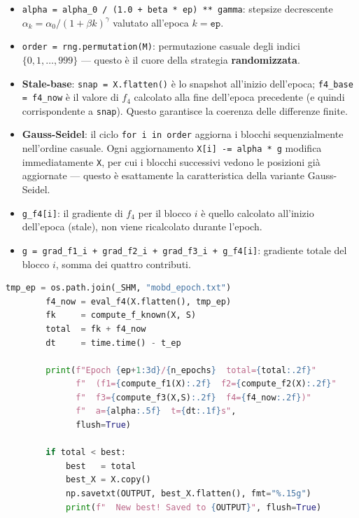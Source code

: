 \documentclass[12pt,a4paper]{article}
\theoremstyle{definition}
\begin{document}
\begin{itemize}[nosep]
  \item \texttt{alpha = alpha\_0 / (1.0 + beta * ep) ** gamma}: stepsize decrescente
        $\alpha_k = \alpha_0 / (1 + \beta k)^\gamma$ valutato all'epoca $k = \texttt{ep}$.
  \item \texttt{order = rng.permutation(M)}: permutazione casuale degli indici
        $\{0, 1, \ldots, 999\}$ — questo è il cuore della strategia \textbf{randomizzata}.
  \item \textbf{Stale-base}: \texttt{snap = X.flatten()} è lo snapshot all'inizio dell'epoca;
        \texttt{f4\_base = f4\_now} è il valore di $f_4$ calcolato alla fine dell'epoca precedente
        (e quindi corrispondente a \texttt{snap}). Questo garantisce la coerenza delle differenze
        finite.
  \item \textbf{Gauss-Seidel}: il ciclo \texttt{for i in order} aggiorna i blocchi
        sequenzialmente nell'ordine casuale. Ogni aggiornamento \texttt{X[i] -= alpha * g}
        modifica immediatamente \texttt{X}, per cui i blocchi successivi vedono le posizioni
        già aggiornate — questo è esattamente la caratteristica della variante Gauss-Seidel.
  \item \texttt{g\_f4[i]}: il gradiente di $f_4$ per il blocco $i$ è quello calcolato
        all'inizio dell'epoca (stale), non viene ricalcolato durante l'epoch.
  \item \texttt{g = grad\_f1\_i + grad\_f2\_i + grad\_f3\_i + g\_f4[i]}: gradiente totale
        del blocco $i$, somma dei quattro contributi.
\end{itemize}

\begin{lstlisting}[language=Python]
        tmp_ep = os.path.join(_SHM, "mobd_epoch.txt")
        f4_now = eval_f4(X.flatten(), tmp_ep)
        fk     = compute_f_known(X, S)
        total  = fk + f4_now
        dt     = time.time() - t_ep

        print(f"Epoch {ep+1:3d}/{n_epochs}  total={total:.2f}"
              f"  (f1={compute_f1(X):.2f}  f2={compute_f2(X):.2f}"
              f"  f3={compute_f3(X,S):.2f}  f4={f4_now:.2f})"
              f"  a={alpha:.5f}  t={dt:.1f}s",
              flush=True)

        if total < best:
            best   = total
            best_X = X.copy()
            np.savetxt(OUTPUT, best_X.flatten(), fmt="%.15g")
            print(f"  New best! Saved to {OUTPUT}", flush=True)
\end{lstlisting}
\end{document}
